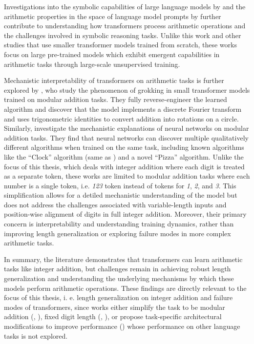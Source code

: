 Investigations into the symbolic capabilities of large language models by \cite{dave_investigating_2024} and the arithmetic properties in the space of language model prompts by \cite{krubinski_basic_2023} further contribute to understanding how transformers process arithmetic operations and the challenges involved in symbolic reasoning tasks. Unlike this work and other studies that use smaller transformer models trained from scratch, these works focus on large pre-trained models which exhibit emergent capabilities in arithmetic tasks through large-scale unsupervised training.

Mechanistic interpretability of transformers on arithmetic tasks is further explored by \cite{nanda_progress_2022}, who study the phenomenon of grokking in small transformer models trained on modular addition tasks. They fully reverse-engineer the learned algorithm and discover that the model implements a discrete Fourier transform and uses trigonometric identities to convert addition into rotations on a circle. Similarly, \cite{zhong_clock_2023} investigate the mechanistic explanations of neural networks on modular addition tasks. They find that neural networks can discover multiple qualitatively different algorithms when trained on the same task, including known algorithms like the ``Clock'' algorithm (same as \cite{nanda_progress_2022}) and a novel ``Pizza'' algorithm. Unlike the focus of this thesis, which deals with integer addition where each digit is treated as a separate token, these works are limited to modular addition tasks where each number is a single token, i.e. \emph{123} token instead of tokens for \emph{1}, \emph{2}, and \emph{3}. This simplification allows for a detiled mechanistic understanding of the model but does not address the challenges associated with variable-length inputs and position-wise alignment of digits in full integer addition. Moreover, their primary concern is interpretability and understanding training dynamics, rather than improving length generalization or exploring failure modes in more complex arithmetic tasks.

In summary, the literature demonstrates that transformers can learn arithmetic tasks like integer addition, but challenges remain in achieving robust length generalization and understanding the underlying mechanisms by which these models perform arithmetic operations. These findings are directly relevant to the focus of this thesis, i. e. length generalization on integer addition and failure modes of transformers, since works either simplify the task to be modular addition (\cite{nanda_progress_2022}, \cite{zhong_clock_2023}), fixed digit length (\cite{lee_teaching_2023}, \cite{quirke_understanding_2023}), or propose task-specific architectural modifications to improve performance (\cite{mcleish_transformers_2024}) whose performance on other language tasks is not explored.

